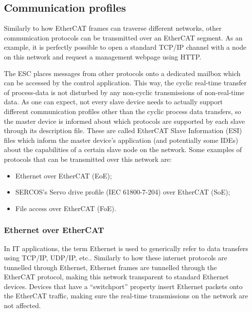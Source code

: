 \subsection{Communication profiles} \label{subsec:comm_profiles}

Similarly to how EtherCAT frames can traverse different networks, other communication protocols can be transmitted over an EtherCAT segment.
As an example, it is perfectly possible to open a standard TCP/IP channel with a node on this network and request a management webpage using HTTP.

The ESC places messages from other protocols onto a dedicated mailbox which can be accessed by the control application.
This way, the cyclic real-time transfer of process-data is not disturbed by any non-cyclic transmissions of non-real-time data.
As one can expect, not every slave device needs to actually support different communication profiles other than the cyclic process data transfers, so the master device is informed about which protocols are supported by each slave through its description file.
These are called EtherCAT Slave Information (ESI) files which inform the master device's application (and potentially some IDEs) about the capabilities of a certain slave node on the network.
Some examples of protocols that can be transmitted over this network are:

\begin{itemize}
	\item Ethernet over EtherCAT (EoE);
	\item SERCOS's \texttrademark{} Servo drive profile (IEC 61800-7-204) over EtherCAT (SoE);
	\item File access over EtherCAT (FoE).
\end{itemize}

\subsubsection{Ethernet over EtherCAT}

In IT applications, the term Ethernet is used to generically refer to data transfers using TCP/IP, UDP/IP, etc..
Similarly to how these internet protocols  are tunnelled through Ethernet, Ethernet frames are tunnelled through the EtherCAT protocol, making this network transparent to standard Ethernet devices.
Devices that have a ``switchport'' property insert Ethernet packets onto the EtherCAT traffic, making sure the real-time transmissions on the network are not affected.

